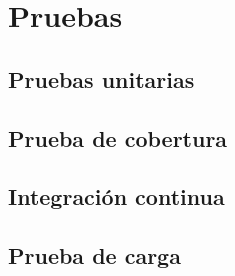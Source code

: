 \chapter{Pruebas}

\section{Pruebas unitarias}

\section{Prueba de cobertura}

\section{Integración continua}

\section{Prueba de carga}
